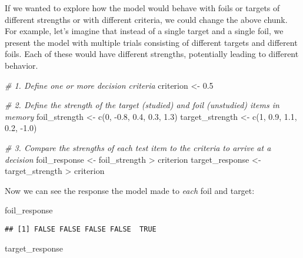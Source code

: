 \documentclass[
]{book}
\newenvironment{Shaded}{\begin{snugshade}}{\end{snugshade}}
\newcommand{\CommentTok}[1]{\textcolor[rgb]{0.56,0.35,0.01}{\textit{#1}}}
\newcommand{\DecValTok}[1]{\textcolor[rgb]{0.00,0.00,0.81}{#1}}
\newcommand{\FloatTok}[1]{\textcolor[rgb]{0.00,0.00,0.81}{#1}}
\newcommand{\FunctionTok}[1]{\textcolor[rgb]{0.00,0.00,0.00}{#1}}
\newcommand{\NormalTok}[1]{#1}
\newcommand{\OtherTok}[1]{\textcolor[rgb]{0.56,0.35,0.01}{#1}}
\newcommand{\SpecialCharTok}[1]{\textcolor[rgb]{0.00,0.00,0.00}{#1}}
\begin{document}
If we wanted to explore how the model would behave with foils or targets of different strengths or with different criteria, we could change the above chunk. For example, let's imagine that instead of a single target and a single foil, we present the model with multiple trials consisting of different targets and different foils. Each of these would have different strengths, potentially leading to different behavior.

\begin{Shaded}
\begin{Highlighting}[]
\CommentTok{\# 1. Define one or more decision criteria}
\NormalTok{criterion }\OtherTok{\textless{}{-}} \FloatTok{0.5}

\CommentTok{\# 2. Define the strength of the target (studied) and foil (unstudied) items in memory}
\NormalTok{foil\_strength }\OtherTok{\textless{}{-}} \FunctionTok{c}\NormalTok{(}\DecValTok{0}\NormalTok{, }\SpecialCharTok{{-}}\FloatTok{0.8}\NormalTok{, }\FloatTok{0.4}\NormalTok{, }\FloatTok{0.3}\NormalTok{, }\FloatTok{1.3}\NormalTok{)}
\NormalTok{target\_strength }\OtherTok{\textless{}{-}} \FunctionTok{c}\NormalTok{(}\DecValTok{1}\NormalTok{, }\FloatTok{0.9}\NormalTok{, }\FloatTok{1.1}\NormalTok{, }\FloatTok{0.2}\NormalTok{, }\SpecialCharTok{{-}}\FloatTok{1.0}\NormalTok{)}

\CommentTok{\# 3. Compare the strengths of each test item to the criteria to arrive at a decision}
\NormalTok{foil\_response }\OtherTok{\textless{}{-}}\NormalTok{ foil\_strength }\SpecialCharTok{\textgreater{}}\NormalTok{ criterion}
\NormalTok{target\_response }\OtherTok{\textless{}{-}}\NormalTok{ target\_strength }\SpecialCharTok{\textgreater{}}\NormalTok{ criterion}
\end{Highlighting}
\end{Shaded}

Now we can see the response the model made to \emph{each} foil and target:

\begin{Shaded}
\begin{Highlighting}[]
\NormalTok{foil\_response}
\end{Highlighting}
\end{Shaded}

\begin{verbatim}
## [1] FALSE FALSE FALSE FALSE  TRUE
\end{verbatim}

\begin{Shaded}
\begin{Highlighting}[]
\NormalTok{target\_response}
\end{Highlighting}
\end{Shaded}
\end{document}
